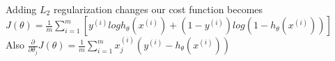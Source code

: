 \begin{answer}\\
Adding $L_2$ regularization changes our cost function becomes\\
$J(\theta)=\frac{1}{m}\sum_{i=1}^{m}[y^{(i)}logh_{\theta}(x^{(i)})+(1-y^{(i)})log(1-h_{\theta}(x^{(i)}))]$\\
Also $\frac{\partial}{\partial \theta_j}J(\theta)=\frac{1}{m}\sum_{i=1}^{m}x_j^{(i)}(y^{(i)}-h_{\theta}(x^{(i)}))$\\
\end{answer}
